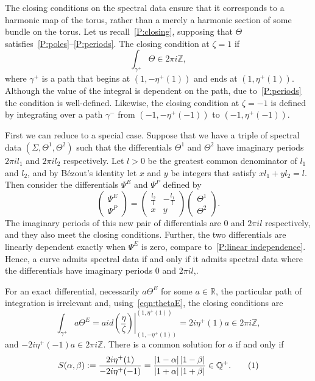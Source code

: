 \documentclass{article}
\numberwithin{equation}{section}
\numberwithin{figure}{section}
\newcommand{\labelthis}[1]{\addtocounter{equation}{1}\tag{\theequation}\label{#1}}
\newcommand{\bra}[1]{\left(#1\right)}
\newcommand{\abs}[1]{\left|#1\right|}
\newcommand{\vt}[2]{\begin{pmatrix} #1 \\ #2 \end{pmatrix}}
\newcommand{\iu}{i}
\newcommand{\Z}{\mathbb{Z}}
\newcommand{\Q}{\mathbb{Q}}
\newcommand{\R}{\mathbb{R}}
\begin{document}
The closing conditions on the spectral data ensure that it corresponds to a harmonic map of the torus, rather than a merely a harmonic section of some bundle on the torus.
Let us recall~\ref{P:closing}, supposing that $\Theta$ satisfies~\ref{P:poles}--\ref{P:periods}. The closing condition at $\zeta=1$ if
\[
\int_{\gamma^{+}} \Theta \in 2\pi\iu \Z,
\]
where $\gamma^+$ is a path that begins at $(1,-\eta^+(1))$ and ends at $(1,\eta^+(1))$. Although the value of the integral is dependent on the path, due to~\ref{P:periods} the condition is well-defined. Likewise, the closing condition at $\zeta=-1$ is defined by integrating over a path $\gamma^-$ from $(-1,-\eta^+(-1))$ to $(-1,\eta^+(-1))$. 

First we can reduce to a special case. Suppose that we have a triple of spectral data $(\Sigma,\Theta^1,\Theta^2)$ such that the differentials $\Theta^1$ and $\Theta^2$ have imaginary periods $2\pi\iu l_1$ and $2\pi\iu l_2$ respectively. Let $l>0$ be the greatest common denominator of $l_1$ and $l_2$, and by B\'ezout's identity let $x$ and $y$ be integers that satisfy $xl_1 + yl_2 = l$. Then consider the differentials $\Psi^E$ and $\Psi^P$ defined by
\[
\vt{\Psi^E}{\Psi^P} =
\begin{pmatrix}
\tfrac{l_2}{l}    &   -\tfrac{l_1}{l} \\
x                       &   y
\end{pmatrix}
\vt{\Theta^1}{\Theta^2}.
\]
The imaginary periods of this new pair of differentials are $0$ and $2\pi\iu l$ respectively, and they also meet the closing conditions. Further, the two differentials are linearly dependent exactly when $\Psi^E$ is zero, compare to~\ref{P:linear independence}. Hence, a curve admits spectral data if and only if it admits spectral data where the differentials have imaginary periods $0$ and $2\pi\iu l$,.

For an exact differential, necessarily $a\Theta^E$ for some $a\in\R$, the particular path of integration is irrelevant and, using~\eqref{eqn:thetaE}, the closing conditions are
\[
\int_{\gamma^{+}} a\Theta^E 
= a\iu \left. d\bra{\frac{\eta}{\zeta}} \right|_{(1, -\eta^+(1))}^{(1, \eta^+(1))} 
= 2\iu \eta^+(1)a 
\in 2\pi\iu \Z,
\]
and $-2\iu \eta^+(-1)a \in 2\pi\iu\Z$.
There is a common solution for $a$ if and only if
\[
S(\alpha,\beta) := \frac{2\iu \eta^+(1)}{-2\iu \eta^+(-1)} = \frac{\abs{1-\alpha}\abs{1-\beta}}{\abs{1+\alpha}\abs{1+\beta}} \in \Q^+.
\labelthis{eqn:def_S}
\]
\end{document}
